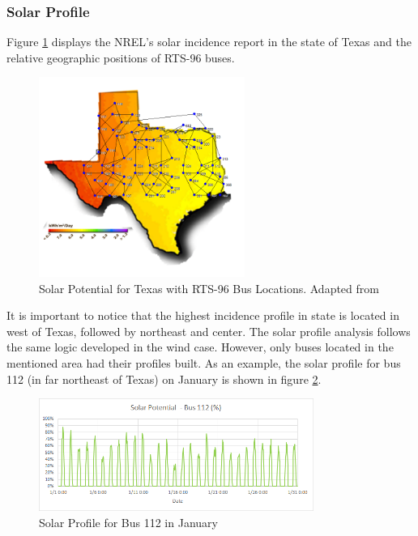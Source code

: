 \documentclass[12pt,LUDisStyle,twosided]{book}
\begin{document}
\subsubsection{Solar Profile}

Figure \ref{fig:texasSolarProfile} displays the NREL's solar incidence report in the state of Texas and the relative geographic positions of RTS-96 buses. 

\begin{figure}[h!] 
	\begin{center}
		\includegraphics[width=0.6\textwidth,keepaspectratio]{texasSolarProfileWithBuses.png}
	  	\caption{Solar Potential for Texas with RTS-96 Bus Locations. Adapted from \cite{texasSolarProfile} }	  				        \label{fig:texasSolarProfile}
	\end{center}
\end{figure}


It is important to notice that the highest incidence profile in state is located in west of Texas, followed by northeast and center. The solar profile analysis follows the same logic developed in the wind case. However, only buses located in the mentioned area had their profiles built. As an example, the solar profile for bus 112 (in far northeast of Texas) on January is shown in figure \ref{fig:solarProfileBus112January}.

\begin{figure}[h!] 
	\begin{center}
		\includegraphics[width=0.8\textwidth,keepaspectratio]{solarPotentialBus112.png}
	  	\caption{Solar Profile for Bus 112 in January }
     	\label{fig:solarProfileBus112January}
	\end{center}
\end{figure}
\end{document}
